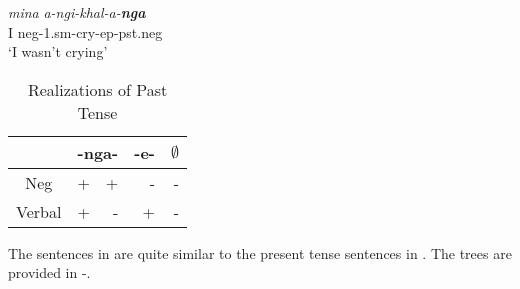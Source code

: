 \documentclass[output=paper]{langsci/langscibook}
\begin{document}
{\begin{exe}
\begin{xlist}
\ex \gll \textit{mina} \textit{a-ngi-khal-a-\textbf{nga}}\\
         I {\sc neg}-1.{\sc sm}-cry-{\sc ep}-{\sc pst.neg}\\
    \glt `I wasn't crying'
\end{xlist}
\end{exe}





\begin{table}
\caption{Realizations of Past Tense} %
\centering %
\begin{tabular}{c| rr|r|r} %
\midrule%
 &\multicolumn{2}{c}{-nga-}& \multicolumn{1}{|c}{-e-}& \multicolumn{1}{|c}{$\emptyset$} \\ [0.5ex] 
\midrule%
Neg & + & + & - & -\\ %
Verbal & + & - & +& -\\[1ex] %
\midrule%
\end{tabular} 
\label{tab:hresult} 
\end{table} 


The sentences in  are quite similar to the present tense sentences in . The trees are provided in -.




}
\end{document}

